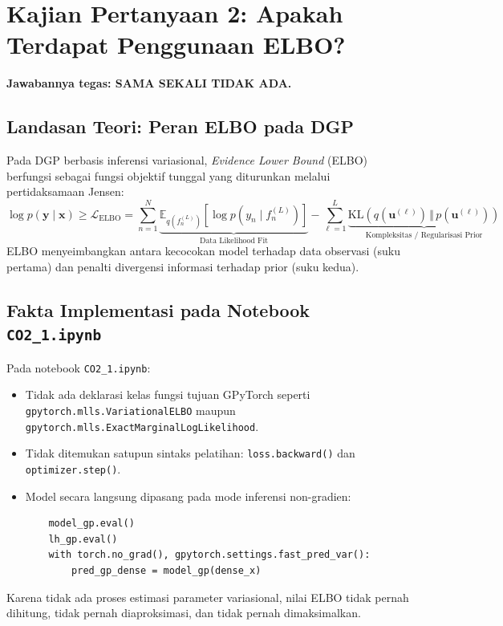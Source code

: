 \documentclass[11pt,a4paper]{article}
\begin{document}
\vspace{0.2cm}

\section{Kajian Pertanyaan 2: Apakah Terdapat Penggunaan ELBO?}
\label{sec:analisis_elbo}

\noindent \textbf{Jawabannya tegas: SAMA SEKALI TIDAK ADA.}

\subsection{Landasan Teori: Peran ELBO pada DGP}
Pada DGP berbasis inferensi variasional, \textit{Evidence Lower Bound} (ELBO) berfungsi sebagai fungsi objektif tunggal yang diturunkan melalui pertidaksamaan Jensen:
\begin{equation}
    \log p(\mathbf{y} \mid \mathbf{x}) \ge \mathcal{L}_{\mathrm{ELBO}} = \sum_{n=1}^N \underbrace{\mathbb{E}_{q(f_n^{(L)})}\left[ \log p(y_n \mid f_n^{(L)}) \right]}_{\text{Data Likelihood Fit}} - \sum_{\ell=1}^L \underbrace{\mathrm{KL}\left( q(\mathbf{u}^{(\ell)}) \,\Vert\, p(\mathbf{u}^{(\ell)}) \right)}_{\text{Kompleksitas / Regularisasi Prior}}
\end{equation}
ELBO menyeimbangkan antara kecocokan model terhadap data observasi (suku pertama) dan penalti divergensi informasi terhadap prior (suku kedua).

\subsection{Fakta Implementasi pada Notebook \texttt{CO2\_1.ipynb}}
Pada notebook \texttt{CO2\_1.ipynb}:
\begin{itemize}
    \item Tidak ada deklarasi kelas fungsi tujuan GPyTorch seperti \texttt{gpytorch.mlls.VariationalELBO} maupun \texttt{gpytorch.mlls.ExactMarginalLogLikelihood}.
    \item Tidak ditemukan satupun sintaks pelatihan: \texttt{loss.backward()} dan \texttt{optimizer.step()}.
    \item Model secara langsung dipasang pada mode inferensi non-gradien:
    \begin{codebox}
    \small
    \begin{verbatim}
    model_gp.eval()
    lh_gp.eval()
    with torch.no_grad(), gpytorch.settings.fast_pred_var():
        pred_gp_dense = model_gp(dense_x)
    \end{verbatim}
    \end{codebox}
\end{itemize}
Karena tidak ada proses estimasi parameter variasional, nilai ELBO tidak pernah dihitung, tidak pernah diaproksimasi, dan tidak pernah dimaksimalkan.
\end{document}
